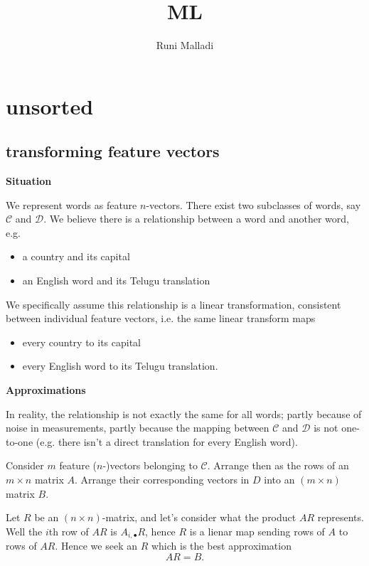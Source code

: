 \documentclass[12pt]{article}
\title{ML}
\author{Runi Malladi}
\begin{document}
\maketitle

\section{unsorted} %

\subsection{transforming feature vectors} %

\textbf{Situation}

We represent words as feature $n$-vectors. There exist two subclasses of words, say $\mathcal{C}$ and $\mathcal{D}$. We believe there is a relationship between a word and another word, e.g. 
\begin{itemize}
	\item a country and its capital 
	\item an English word and its Telugu translation
\end{itemize}
We specifically assume this relationship is a linear transformation, consistent between individual feature vectors, i.e. the same linear transform maps 
\begin{itemize}
	\item every country to its capital 
	\item every English word to its Telugu translation.
\end{itemize}

\textbf{Approximations}

In reality, the relationship is not exactly the same for all words; partly because of noise in measurements, partly because the mapping between $\mathcal{C}$ and $\mathcal{D}$ is not one-to-one (e.g. there isn't a direct translation for every English word).

Consider $m$ feature ($n$-)vectors belonging to $\mathcal{C}$. Arrange then as the rows of an $m\times n$ matrix $A$. Arrange their corresponding vectors in $D$ into an $(m\times n)$ matrix $B$. 

Let $R$ be an $(n\times n)$-matrix, and let's consider what the product $AR$ represents. Well the $i$th row of $AR$ is $A_{i,\bullet}R$, hence $R$ is a lienar map sending rows of $A$ to rows of $AR$. Hence we seek an $R$ which is the best approximation 
\begin{equation*}
	AR = B.
\end{equation*}
\end{document}
